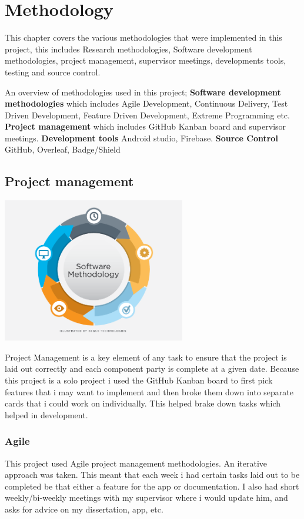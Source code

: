 \chapter{Methodology}
This chapter covers the various methodologies that were implemented in this project, this includes Research methodologies, Software development methodologies, project management, supervisor meetings, developments tools, testing and source control.\newline

An overview of methodologies used in this project;
\textbf{Software development methodologies} which includes Agile Development, Continuous Delivery, Test Driven Development, Feature Driven Development, Extreme Programming etc.
\textbf{Project management} which includes GitHub Kanban board and supervisor meetings.
\textbf{Development tools} Android studio, Firebase.
\textbf{Source Control} GitHub, Overleaf, Badge/Shield

\newpage
\medskip
\section{Project management}
\begin{center}
    \includegraphics[width=8cm,keepaspectratio]{Images/Software_Method.png}

\end{center}
\par
\par
\medskip
Project Management is a key element of any task to ensure that the project is laid out correctly and each component party is complete at a given date. Because this project is a solo project i used the GitHub Kanban board to first pick features that i may want to implement and then broke them down into separate cards that i could work on individually. This helped brake down tasks which helped in development.

\subsection{Agile}
This project used Agile project management methodologies. An iterative approach was taken. This meant that each week i had certain tasks laid out to be completed be that either a feature for the app or documentation. I also had short weekly/bi-weekly meetings with my supervisor where i would update him, and asks for advice on my dissertation, app, etc. 

